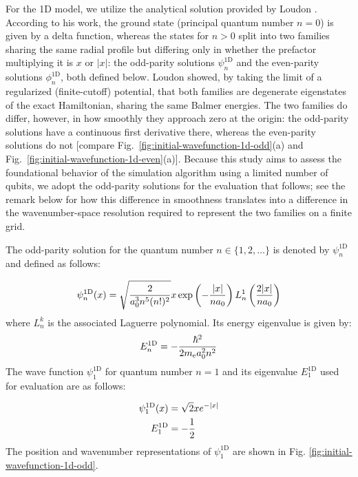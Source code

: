 \documentclass[aip-draft.tex]{subfiles}
\begin{document}
For the 1D model, we utilize the analytical solution provided by Loudon
\cite{Loudon1959.10.1119/1.1934950}. According to his work, the ground state
(principal quantum number $n=0$) is given by a delta function, whereas the
states for $n>0$ split into two families sharing the same radial profile but
differing only in whether the prefactor multiplying it is $x$ or $|x|$: the
odd-parity solutions $\psi_n^{\mathrm{1D}}$ and the even-parity solutions
$\phi_n^{\mathrm{1D}}$, both defined below. Loudon showed, by taking the
limit of a regularized (finite-cutoff) potential, that both families are
degenerate eigenstates of the exact Hamiltonian, sharing
the same Balmer energies. The two families do differ, however, in how
smoothly they approach zero at the origin: the odd-parity solutions have a
continuous first derivative there, whereas the even-parity solutions do not
[compare Fig.~\ref{fig:initial-wavefunction-1d-odd}(a) and
Fig.~\ref{fig:initial-wavefunction-1d-even}(a)]. Because this study aims to
assess the foundational behavior of the simulation algorithm using a
limited number of qubits, we adopt the odd-parity solutions for the
evaluation that follows; see the remark below for how this difference in
smoothness translates into a difference in the wavenumber-space resolution
required to represent the two families on a finite grid.

The odd-parity solution for the quantum number $n \in \{1, 2, \dots\}$ is
denoted by $\psi_n^{\mathrm{1D}}$ and defined as follows:

\begin{equation}
\psi_n^{\mathrm{1D}}(x)=\sqrt{\frac{2}{a_0^3n^5(n!)^2}}
x\exp\left(-\frac{{\left| x \right|}}{na_0}\right)L_n^1\left(\frac{2{\left| x \right|}}{na_0}\right)
\end{equation}
where $L_n^k$ is the associated Laguerre polynomial. Its energy eigenvalue is given by:
\begin{equation}
    E_n^{\mathrm{1D}}=-\frac{\hbar^2}{2m_{\mathrm{e}} a_0^2 n^2}
\end{equation}
The wave function $\psi_1^{\mathrm{1D}}$ for quantum number $n=1$ and its
eigenvalue $E_1^{\mathrm{1D}}$ used for evaluation are as follows:

\begin{align}
\psi_1^{\mathrm{1D}}(x)&=\sqrt{2} x e^{-{\left| x \right|}}
\label{eq:psi1D1-wave-function}\\
E_1^{\mathrm{1D}}&=-\frac{1}{2}
\label{eq:psi1D1-energy}
\end{align}
The position and wavenumber representations of $\psi_1^{\mathrm{1D}}$ are shown
in Fig. \ref{fig:initial-wavefunction-1d-odd}.
\end{document}
